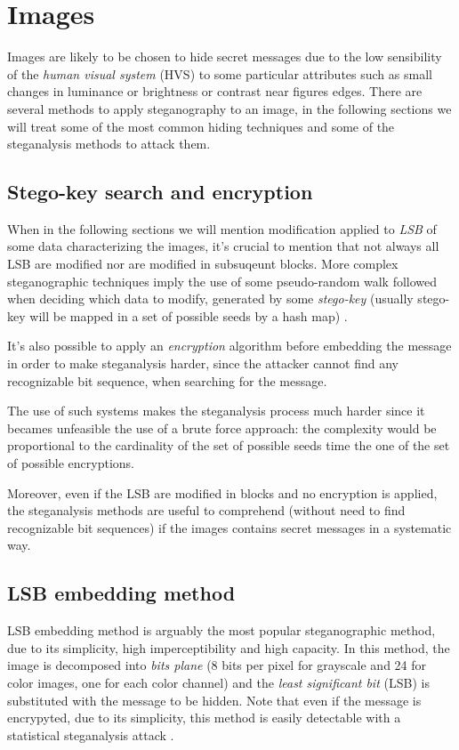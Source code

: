 \documentclass[../../main.tex]{subfiles}
\begin{document}
    
\section{Images}
Images are likely to be chosen to hide secret messages due to the low
sensibility of the \emph{human visual system} (HVS) to some particular
attributes such as small changes in luminance or brightness or contrast near
figures edges.
There are several methods to apply steganography to an image, in the
following sections we will treat some of the most common hiding techniques
and some of the steganalysis methods to attack them.


\subsection{Stego-key search and encryption}
When in the following sections we will mention modification applied to
\emph{LSB} of some data characterizing the images, it's crucial to mention
that not always all LSB are modified nor are modified in subsuqeunt blocks.
More complex steganographic techniques imply the use of some pseudo-random
walk followed when deciding which data to modify, generated by some
\emph{stego-key} (usually stego-key will be mapped in a set of possible
seeds by a hash map) \cite{stego-key}.

It's also possible to apply an \emph{encryption} algorithm before embedding
the message in order to make steganalysis harder, since the attacker cannot
find any recognizable bit sequence, when searching for the message.

The use of such systems makes the steganalysis process much harder since it
becames unfeasible the use of a brute force approach: the complexity would
be proportional to the cardinality of the set of possible seeds time the
one of the set of possible encryptions.

Moreover, even if the LSB are modified in blocks and no encryption is
applied, the steganalysis methods are useful to comprehend (without need to
find recognizable bit sequences) if the images contains secret messages in
a systematic way.


\subsection{LSB embedding method}
LSB embedding method is arguably the most popular steganographic method, due
to its simplicity, high imperceptibility and high capacity.
In this method, the image is decomposed into \emph{bits plane} (8 bits per
pixel for grayscale and 24 for color images, one for each color channel)
and the \emph{least significant bit} (LSB) is substituted with the message
to be hidden.
Note that even if the message is encrypyted, due to its simplicity, this
method is easily detectable with a statistical steganalysis attack
\cite{techniques-data-hiding}.
\end{document}

